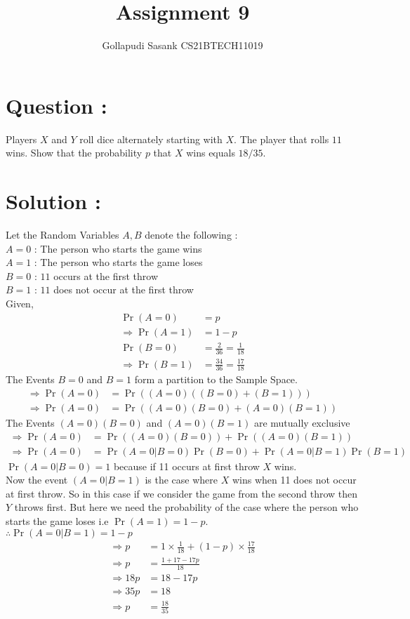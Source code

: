 \documentclass[journal,twocolumn]{IEEEtran}
\title{Assignment 9}
\author{Gollapudi Sasank CS21BTECH11019}
\providecommand{\pr}[1]{\ensuremath{\Pr\left(#1\right)}}
\begin{document}
\maketitle
\section*{Question : }
Players $X$ and $Y$ roll dice alternately starting with $X$. The player that rolls $11$ wins. Show that the probability $p$ that $X$ wins equals $18/35$.
\section*{Solution : }
Let the Random Variables $A,B$ denote the following : \\
$A=0$ : The person who starts the game  wins \\
$A=1$ : The person who starts the game  loses \\
$B=0$ : $11$ occurs at the first throw \\
$B=1$ : $11$ does not occur at the first throw \\
Given,
\begin{align}
\pr{A=0} &= p \\
\Rightarrow \pr{A=1} &= 1-p \\
\pr{B=0} &= \frac{2}{36} = \frac{1}{18} \\
\Rightarrow \pr{B=1} &= \frac{34}{36} = \frac{17}{18}
\end{align}
The Events $B=0$ and $B=1$ form a partition to the Sample Space. \\
\begin{align}
\Rightarrow \pr{A=0} &= \pr{(A=0)((B=0)+(B=1))} \\
\Rightarrow \pr{A=0} &= \pr{(A=0)(B=0)+(A=0)(B=1)}
\end{align}
The Events $(A=0)(B=0)$ and $(A=0)(B=1)$ are mutually exclusive 
\begin{align}
\Rightarrow \pr{A=0} &= \pr{(A=0)(B=0)} + \pr{(A=0)(B=1)} \\
\Rightarrow \pr{A=0} &= \pr{A=0|B=0}\pr{B=0} + \pr{A=0|B=1}\pr{B=1}
\end{align}
$\pr{A=0|B=0} = 1$ because  if 11 occurs at first throw $X$ wins.\\
Now the event $(A=0|B=1)$ is the case where $X$ wins when 11 does not occur at first throw. So in this case if we consider the game from the second throw then $Y$ throws first. But here we need the probability of the case where the person who starts the game loses i.e $\pr{A=1} = 1-p $.\\
$\therefore \pr{A=0|B=1} = 1-p $
\begin{align}
\Rightarrow p &= 1 \times \frac{1}{18} + (1-p) \times \frac{17}{18}\\
\Rightarrow p &= \frac{1 + 17 - 17p}{18} \\
\Rightarrow 18p &= 18 - 17p \\
\Rightarrow 35p &= 18 \\
\Rightarrow p &= \frac{18}{35}
\end{align}
\end{document}

